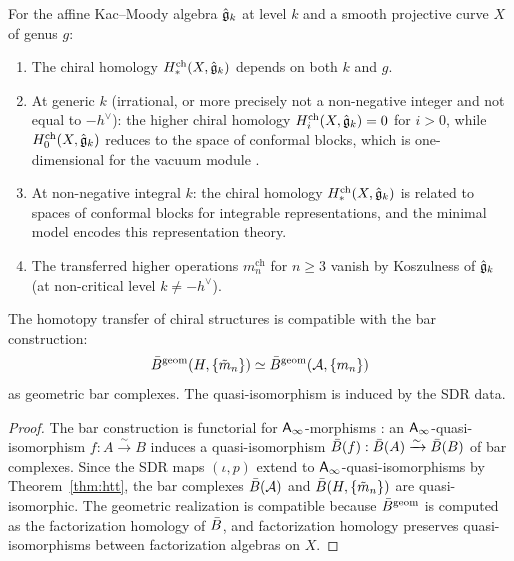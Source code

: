 \begin{example}
\label{ex:km-minimal}
For the affine Kac--Moody algebra $\hat{\mathfrak{g}}_k$ at level $k$ and a smooth projective curve $X$ of genus $g$:
\begin{enumerate}[label=(\roman*)]
\item The chiral homology $H^{\mathrm{ch}}_*(X, \hat{\mathfrak{g}}_k)$ depends on both $k$ and $g$.
\item At generic $k$ (irrational, or more precisely not a non-negative integer and not equal to $-h^\vee$): the higher chiral homology $H^{\mathrm{ch}}_i(X, \hat{\mathfrak{g}}_k) = 0$ for $i > 0$, while $H^{\mathrm{ch}}_0(X, \hat{\mathfrak{g}}_k)$ reduces to the space of conformal blocks, which is one-dimensional for the vacuum module \cite{BD04}.
\item At non-negative integral $k$: the chiral homology $H^{\mathrm{ch}}_*(X, \hat{\mathfrak{g}}_k)$ is related to spaces of conformal blocks for integrable representations, and the minimal model encodes this representation theory.
\item The transferred higher operations $m_n^{\mathrm{ch}}$ for $n \geq 3$
vanish by Koszulness of $\hat{\mathfrak{g}}_k$ (at non-critical level $k \neq -h^\vee$).
\end{enumerate}
\end{example}

\begin{proposition}
\label{prop:transfer-bar}
The homotopy transfer of chiral structures is compatible with the bar construction:
\[
\bar{B}^{\mathrm{geom}}(H, \{\tilde{m}_n\}) \simeq \bar{B}^{\mathrm{geom}}(\mathcal{A}, \{m_n\})
\]
as geometric bar complexes. The quasi-isomorphism is induced by the SDR data.
\end{proposition}

\begin{proof}
The bar construction is functorial for $\mathsf{A}_{\infty}$-morphisms \cite{LV12}: an $\mathsf{A}_{\infty}$-quasi-isomorphism $f: A \xrightarrow{\sim} B$ induces a quasi-isomorphism $\bar{B}(f): \bar{B}(A) \xrightarrow{\sim} \bar{B}(B)$ of bar complexes. Since the SDR maps $(\iota, p)$ extend to $\mathsf{A}_{\infty}$-quasi-isomorphisms by Theorem~\ref{thm:htt}, the bar complexes $\bar{B}(\mathcal{A})$ and $\bar{B}(H, \{\tilde{m}_n\})$ are quasi-isomorphic. The geometric realization is compatible because $\bar{B}^{\mathrm{geom}}$ is computed as the factorization homology of $\bar{B}$, and factorization homology preserves quasi-isomorphisms between factorization algebras on $X$.
\end{proof}


